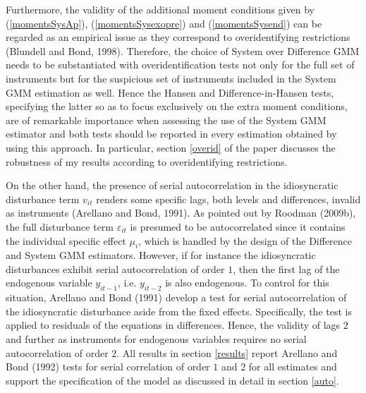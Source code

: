 \documentclass[a4paper, 12pt]{article}
\begin{document}
Furthermore, the validity of the additional moment conditions given by (\ref{momentsSysAp}), (\ref{momentsSysexopre}) and (\ref{momentsSysend}) can be regarded as an empirical issue as they correspond to overidentifying restrictions (Blundell and Bond, 1998). Therefore, the choice of System over Difference GMM needs to be substantiated with overidentification tests not only for the full set of instruments but for the suspicious set of instruments included in the System GMM estimation as well. Hence the Hansen and Difference-in-Hansen tests, specifying the latter so as to focus exclusively on the extra moment conditions, are of remarkable importance when assessing the use of the System GMM estimator and both tests should be reported in every estimation obtained by using this approach. In particular, section \ref{overid} of the paper discusses the robustness of my results according to overidentifying restrictions.

On the other hand, the presence of serial autocorrelation in the idiosyncratic disturbance term $v_{it}$ renders some specific lags, both levels and differences, invalid as instruments (Arellano and Bond, 1991). As pointed out by Roodman (2009b), the full disturbance term $\varepsilon_{it}$ is presumed to be autocorrelated since it contains the individual specific effect $\mu_i$, which is handled by the design of the Difference and System GMM estimators. However, if for instance the idiosyncratic disturbances exhibit serial autocorrelation of order $1$, then the first lag of the endogenous variable $y_{it-1}$, i.e. $y_{it-2}$ is also endogenous. To control for this situation, Arellano and Bond (1991) develop a test for serial autocorrelation of the idiosyncratic disturbance aside from the fixed effects. Specifically, the test is applied to residuals of the equations in differences. Hence, the validity of lags $2$ and further as instruments for endogenous variables requires no serial autocorrelation of order $2$. All results in section \ref{results} report Arellano and Bond (1992) tests for serial correlation of order $1$ and $2$ for all estimates and support the specification of the model as discussed in detail in section \ref{auto}.
\end{document}
